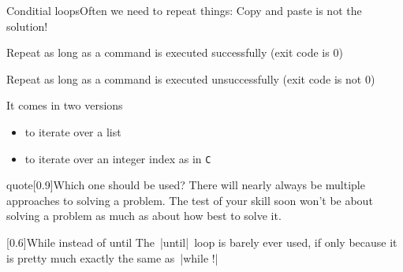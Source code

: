 
\begin{frame}{Conditial loops}{Often we need to repeat things: Copy and paste is not the solution!}
    \vspace{-3mm}
    \begin{description}
        \item[\texttt{while}] Repeat as long as a command is executed successfully (exit code is 0)
        \item[\texttt{until}] Repeat as long as a command is executed unsuccessfully (exit code is not 0)
        \item[\texttt{for}] It comes in two versions
                            \begin{itemize}
                                \item to iterate over a list
                                \item to iterate over an integer index as in \texttt{C}
                            \end{itemize}
    \end{description}
    \begin{varblock}{quote}[0.9\textwidth]{Which one should be used?}
        There will nearly always be multiple approaches to solving a problem.
        The test of your skill soon won't be about solving a problem as much as about how best to solve it.
    \end{varblock}
    \begin{varblock}{}[0.6\textwidth]{While instead of until}
        The \,\bash|until|\, loop is barely ever used, if only because it is pretty much exactly the same as \,\bash|while !|
    \end{varblock}
\end{frame}
